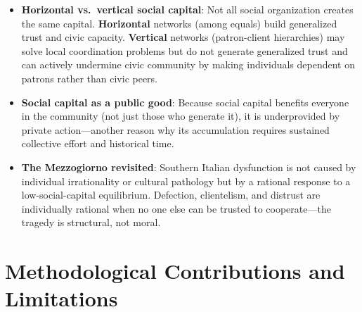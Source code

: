 \documentclass[12pt]{article}
\begin{document}
\begin{itemize}[leftmargin=*, itemsep=4pt]
\begin{itemize}[leftmargin=*, itemsep=4pt]
    \item \textbf{Horizontal vs.\ vertical social capital}: Not all social organization creates the same capital. \textbf{Horizontal} networks (among equals) build generalized trust and civic capacity. \textbf{Vertical} networks (patron-client hierarchies) may solve local coordination problems but do not generate generalized trust and can actively undermine civic community by making individuals dependent on patrons rather than civic peers.
    \item \textbf{Social capital as a public good}: Because social capital benefits everyone in the community (not just those who generate it), it is underprovided by private action---another reason why its accumulation requires sustained collective effort and historical time.
    \item \textbf{The Mezzogiorno revisited}: Southern Italian dysfunction is not caused by individual irrationality or cultural pathology but by a rational response to a low-social-capital equilibrium. Defection, clientelism, and distrust are individually rational when no one else can be trusted to cooperate---the tragedy is structural, not moral.
\end{itemize}

\section{Methodological Contributions and Limitations}


\end{itemize}
\end{document}

